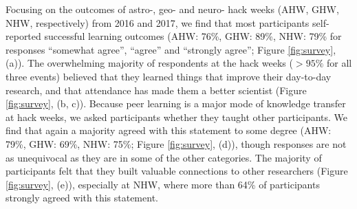 Focusing on the outcomes of astro-, geo- and neuro- hack weeks (AHW, GHW, NHW, respectively) from 2016 and 2017, we find that most participants self-reported successful learning outcomes (AHW: 76\%, GHW: 89\%, NHW: 79\% for responses ``somewhat agree'', ``agree'' and ``strongly agree''; Figure \ref{fig:survey}, (a)).
The overwhelming majority of respondents at the hack weeks ($>95\%$ for all three events) believed that they learned things that improve their day-to-day research, and that attendance has made them a better scientist  (Figure \ref{fig:survey}, (b, c)).
Because peer learning is a major mode of knowledge transfer at hack weeks, we asked participants whether they taught other participants.
We find that again a majority agreed with this statement to some degree (AHW: 79\%, GHW: 69\%, NHW: 75\%; Figure \ref{fig:survey}, (d)), though responses are not as unequivocal as they are in some of the other categories.
The majority of participants felt that they built valuable connections to other researchers (Figure \ref{fig:survey}, (e)), especially at NHW, where more than 64\% of participants strongly agreed with this statement.

